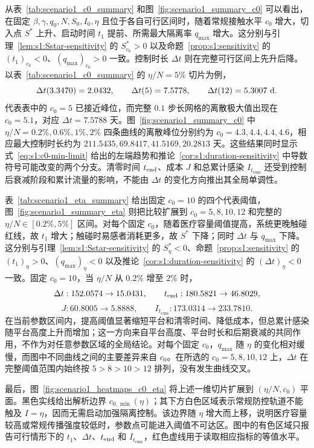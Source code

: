 \documentclass[lang=cn,a4paper,newtx]{elegantpaper}
\numberwithin{equation}{section}
\theoremstyle{plain}
\newcommand{\Itcum}{I_{t_{\mathrm{cum}}}}
\begin{document}
从表~\ref{tab:scenario1_c0_summary} 和图~\ref{fig:scenario1_summary_c0} 可以看出，在固定 $\beta,\gamma,q_0,N,S_0,I_0,\eta$ 且位于各自可行区间时，随着常规接触水平 $c_0$ 增大，切入点 $S^*$ 上升、启动时间 $t_1$ 提前、所需最大隔离率 $q_{\max}$ 增大。这分别与引理~\ref{lem:s1:Sstar-sensitivity} 的 $S^*_{c_0}>0$ 以及命题~\ref{prop:s1:sensitivity} 的 $(t_1)_{c_0}<0$、$(q_{\max})_{c_0}>0$ 一致。控制时长 $\Delta t$ 则在完整可行区间上先升后降。以表~\ref{tab:scenario1_c0_summary} 的 $\eta/N=5\%$ 切片为例，
\[
\Delta t(3.3470)=2.0432,\qquad
\Delta t(5)=7.5778,\qquad
\Delta t(12)=5.3007\ {\rm d}.
\]
代表表中的 $c_0=5$ 已接近峰位，而完整 $0.1$ 步长网格的离散极大值出现在 $c_0=5.1$，对应 $\Delta t=7.5788$ 天。图~\ref{fig:scenario1_summary_c0} 中 $\eta/N=0.2\%,0.6\%,1\%,2\%$ 四条曲线的离散峰位分别约为 $c_0=4.3,4.4,4.4,4.6$，相应最大控制时长约为 $211.5435,69.8417,41.5169,20.2813$ 天。这些结果同时显示式~\eqref{eq:s1:c0-min-limit} 给出的左端趋势和推论~\ref{cor:s1:duration-sensitivity} 中导数符号可能改变的两个分支。清零时间 $t_{\rm end}$、成本 $J$ 和总累计感染 $\Itcum$ 还受到控制后衰减阶段和累计流量的影响，不能由 $\Delta t$ 的变化方向推出其全局单调性。

表~\ref{tab:scenario1_eta_summary} 给出固定 $c_0=10$ 的四个代表阈值，图~\ref{fig:scenario1_summary_eta} 则把比较扩展到 $c_0=5,8,10,12$ 和完整的 $\eta/N\in[0.2\%,5\%]$ 区间。对每个固定 $c_0$，随着医疗容量阈值提高，系统更晚触碰红线，故 $t_1$ 增大；触碰时易感者消耗更多，故 $S^*$ 下降；同时 $\Delta t$ 与 $q_{\max}$ 下降。这分别与引理~\ref{lem:s1:Sstar-sensitivity} 的 $S^*_\eta<0$、命题~\ref{prop:s1:sensitivity} 的 $(t_1)_\eta>0$、$(q_{\max})_\eta<0$ 以及推论~\ref{cor:s1:duration-sensitivity} 的 $(\Delta t)_\eta<0$ 一致。固定 $c_0=10$，当 $\eta/N$ 从 $0.2\%$ 增至 $2\%$ 时，
\[
\Delta t:152.0574\to15.0431,\qquad
t_{\rm end}:180.5821\to46.8029,
\]
\[
J:60.8005\to5.8888,\qquad
\Itcum:173.0314\to233.7810.
\]
在当前参数区间内，提高阈值显著缩短平台和清零时间、降低成本，但总累计感染随平台高度上升而增加；这一方向来自平台高度、平台时长和后期衰减的共同作用，不作为对任意参数区域的全局结论。对每个固定 $c_0$，$q_{\max}$ 随 $\eta$ 的变化相对缓慢，而图中不同曲线之间的主要差异来自 $c_0$。在所选的 $c_0=5,8,10,12$ 上，$\Delta t$ 在完整阈值范围内始终按 $5>8>10>12$ 排列，没有发生曲线交叉。

最后，图~\ref{fig:scenario1_heatmaps_c0_eta} 将上述一维切片扩展到 $(\eta/N,c_0)$ 平面。黑色实线给出解析边界 $c_{0,\min}(\eta)$；其下方白色区域表示常规防控轨道不能触及 $I=\eta$，因而无需启动加强隔离控制。该边界随 $\eta$ 增大而上移，说明医疗容量较高或常规传播强度较低时，参数点可能进入阈值不可达区。图中的有色区域只报告可行情形下的 $t_1$、$\Delta t$、$t_{\rm end}$ 和 $\Itcum$，红色虚线用于读取相应指标的等值水平。
\end{document}
